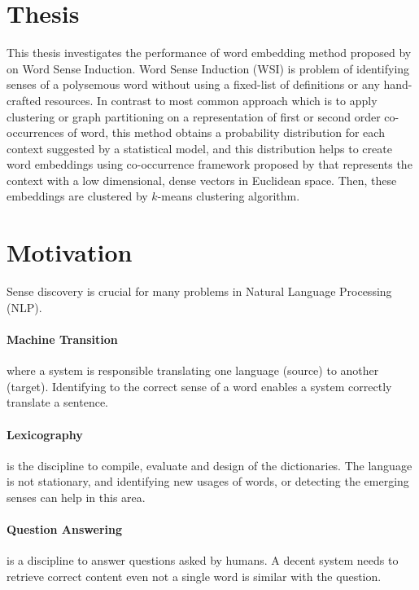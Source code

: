 \section{Thesis}

This thesis investigates the performance of word embedding method proposed by \cite{yatbaz2012learning} on Word Sense Induction. Word Sense Induction (WSI) is problem of identifying senses of a polysemous word without using a fixed-list of definitions or any hand-crafted resources. In contrast to most common approach which is to apply clustering or graph partitioning on a representation of first or second order co-occurrences of word, this method obtains a probability distribution for each context suggested by a statistical model, and this distribution helps to create word embeddings using co-occurrence framework proposed by \cite{globerson2004euclidean} that represents the context with a low dimensional, dense vectors in Euclidean space. Then, these embeddings are clustered by $k$-means clustering algorithm.


\section{Motivation}

Sense discovery is crucial for many problems in Natural Language Processing (NLP). 

\paragraph{Machine Transition} where a system is responsible translating one language (source) to another (target). Identifying to the correct sense of a word enables a system correctly translate a sentence.

\paragraph{Lexicography} is the discipline to compile, evaluate and design of the dictionaries. The language is not stationary, and identifying new usages of words, or detecting the emerging senses can help in this area.

\paragraph{Question Answering} is a discipline to answer questions asked by humans. A decent system needs to retrieve correct content even not a single word is similar with the question.

